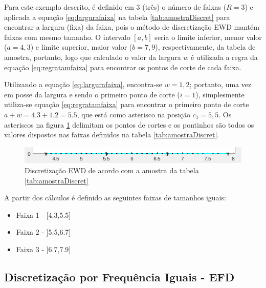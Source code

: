 Para este exemplo descrito, é definido em 3 (três) o número de faixas (${R=3}$) e aplicada a equação \ref{eq:largurafaixa} na tabela \ref{tab:amostraDiscret} para encontrar a largura (fixa) da faixa, pois o método de discretização EWD mantém faixas com mesmo tamanho. O intervalo ${[a,b]}$ seria o limite inferior, menor valor (${a=4,3}$) e limite superior, maior valor (${b=7,9}$), respectivamente, da tabela de amostra, portanto, logo que calculado o valor da largura ${w}$ é utilizada a regra da equação \ref{eq:regratamfaixa} para encontrar os pontos de corte de cada faixa.

Utilizando a equação \ref{eq:largurafaixa}, encontra-se ${w=1,2}$; portanto, uma vez em posse da largura e sendo o primeiro ponto de corte (${i=1}$), simplesmente utiliza-se equação \ref{eq:regratamfaixa} para encontrar o primeiro ponto de corte ${a+w = 4.3 + 1.2 = 5.5}$, que está como asterisco na posição ${c_1=5,5}$. Os asteriscos na figura \ref{fig:faixasFihseririsExemploEWD} delimitam os pontos de cortes e os pontinhos são todos os valores dispostos nas faixas definidos na tabela \ref{tab:amostraDiscret}.

\begin{figure}[h] 
        \centering
        \includegraphics[scale=0.8]{figs/ewd_fisheriris_col1.png}
        \caption{Discretização EWD de acordo com a amostra da tabela \ref{tab:amostraDiscret}}%
        \label{fig:faixasFihseririsExemploEWD}
\end{figure}

A partir dos cálculos é definido as seguintes faixas de tamanhos iguais:
\begin{itemize}[noitemsep]
 \item Faixa 1 - [4.3,5.5]
 \item Faixa 2 - ]5.5,6.7]
 \item Faixa 3 - ]6.7,7.9]
\end{itemize}


\subsection{Discretização por Frequência Iguais - EFD}\label{cap:refTeor:subsec:efd}

